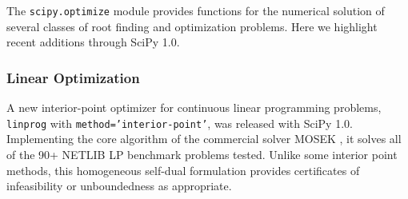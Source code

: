 \newcommand{\RR}{\ensuremath{\mathbb{R}}}
The \texttt{scipy.optimize} module provides functions for the numerical
solution of several classes of root finding and optimization problems.
Here we highlight recent additions through SciPy 1.0.



\subsubsection*{Linear Optimization}

A new interior-point optimizer for continuous linear programming problems, \texttt{linprog} with \texttt{method='interior-point'}, was released with SciPy 1.0. Implementing the core algorithm of the commercial solver MOSEK \cite{andersen2000mosek}, it solves all of the 90+ NETLIB LP benchmark problems \cite{netlib} tested. Unlike some interior point methods, this homogeneous self-dual formulation provides certificates of infeasibility or unboundedness as appropriate. 

